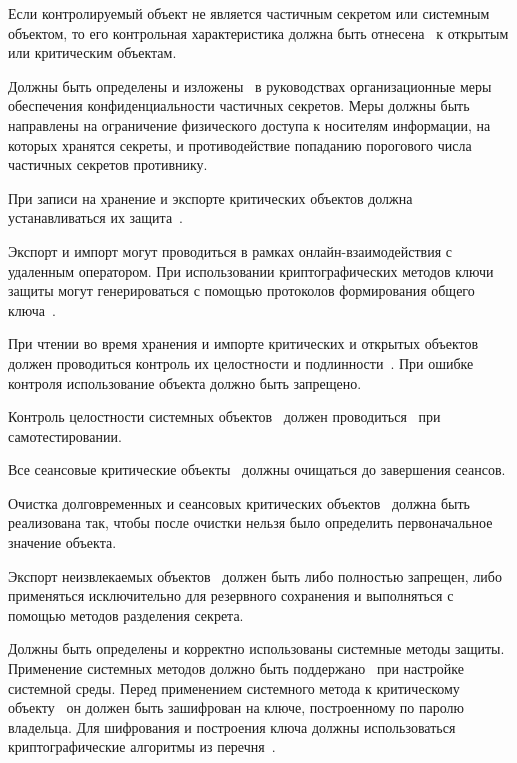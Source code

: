 Если контролируемый объект не является частичным секретом или системным
объектом, то его контрольная характеристика должна быть 
отнесена~ к открытым или критическим объектам.

\label{R.DP.Org} %
Должны быть определены и изложены~ 
в руководствах организационные меры обеспечения конфиденциальности 
частичных секретов. Меры должны быть направлены на ограничение физического 
доступа к носителям информации, на которых хранятся секреты, и 
противодействие попаданию порогового числа частичных секретов 
противнику. 

\label{R.DP.Export} %
При записи на хранение и экспорте критических объектов должна 
устанавливаться их защита~.

\begin{note}
Экспорт и импорт могут проводиться в рамках онлайн-взаимодействия с удаленным
оператором. При использовании криптографических методов ключи защиты 
могут генерироваться с помощью протоколов формирования общего 
ключа~.
\end{note}

\label{R.DP.Import} %
При чтении во время хранения и импорте критических и открытых объектов  
должен проводиться контроль их целостности и подлинности~. 
При ошибке контроля использование объекта должно быть запрещено. 

\label{R.DP.System} %
Контроль целостности системных объектов~ 
должен проводиться~ при самотестировании.

\label{R.DP.Session} %
Все сеансовые критические объекты~
должны очищаться до завершения сеансов.

\label{R.DP.Zero} %
Очистка долговременных и сеансовых критических объектов~ 
должна быть реализована так, чтобы после очистки нельзя было определить 
первоначальное значение объекта. 

\label{R.DP.NonExtr} %
Экспорт неизвлекаемых объектов~ должен быть либо полностью 
запрещен, либо применяться исключительно для резервного сохранения 
и выполняться с помощью методов разделения секрета. 

\label{R.DP.Sys} %
Должны быть определены и корректно использованы системные методы защиты.
Применение системных методов должно быть поддержано~
при настройке системной среды.
%
Перед применением системного метода к критическому объекту~ 
он должен быть зашифрован на ключе, построенному по паролю владельца. 
%
Для шифрования и построения ключа должны использоваться 
криптографические алгоритмы из перечня~.

